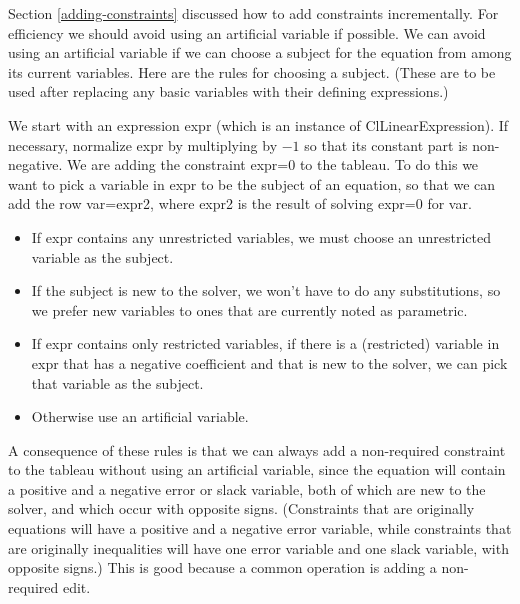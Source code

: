 \documentclass{article}
\begin{document}
Section \ref{adding-constraints} discussed how to add constraints
incrementally.  For efficiency we should avoid using an artificial
variable if possible.  We can avoid using an artificial variable if we can
choose a subject for the equation from among its current variables.
Here are the rules for choosing a subject.  (These are to be used after
replacing any basic variables with their defining expressions.)  

We start with an expression {\sf expr} (which is an instance of {\sf
ClLinearExpression}).  If necessary, normalize {\sf expr} by multiplying by
$-1$ so that its constant part is non-negative.  We are adding the
constraint {\sf expr=0} to the tableau.  To do this we want to pick a
variable in {\sf expr} to be the subject of an equation, so that we can add
the row {\sf var=expr2}, where {\sf expr2} is the result of solving {\sf
expr=0} for {\sf var}.

\begin{itemize}

\item If {\sf expr} contains any unrestricted variables, we must choose an
unrestricted variable as the subject.

\item If the subject is new to the solver, we won't have to do any
substitutions, so we prefer new variables to ones that are currently noted
as parametric.  

\item If {\sf expr} contains only restricted variables, if there is a
(restricted) variable in {\sf expr} that has a negative coefficient and
that is new to the solver, we can pick that variable as the subject.

\item Otherwise use an artificial variable.

\end{itemize}

A consequence of these rules is that we can always add a non-required
constraint to the tableau without using an artificial variable, since the
equation will contain a positive and a negative error 
or slack variable, both of
which are new to the solver, and which occur with opposite signs.  
(Constraints that are originally equations will have a positive and
a negative error variable, while constraints that are originally inequalities
will have one error variable and one slack variable, with opposite signs.)  This is
good because a common operation is adding a non-required edit.
\end{document}
